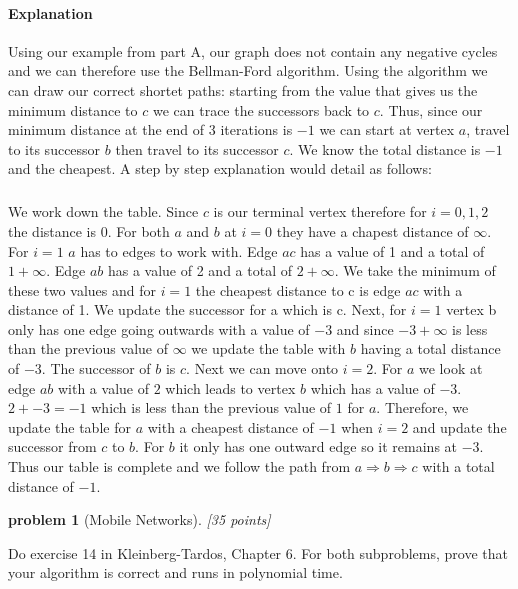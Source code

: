 \documentclass[10pt]{article}
\newtheorem{problem}{\sc\color{cit}problem}
\begin{document}
{\paragraph{Explanation} Using our example from part A, our graph does not contain any negative cycles and we can therefore use the Bellman-Ford algorithm. Using the algorithm we can draw our correct
shortet paths: starting from the value that gives us the minimum distance to $c$ we can trace the successors back to $c$. Thus, since our minimum distance at the end of 3 iterations is $-1$ we can start at vertex $a$,
travel to its successor $b$ then travel to its successor $c$. We know the total distance is $-1$ and the cheapest. A step by step explanation would detail as follows:

\subparagraph{} We work down the table. Since $c$ is our terminal vertex therefore for $i = 0, 1, 2$ the distance is 0. For both $a$ and $b$ at $i = 0$ they have a chapest distance of $\infty$. 
For $i = 1$ $a$ has to edges to work with. Edge $ac$ has a value of 1 and a total of $1 + \infty$. Edge $ab$ has a value of 2 and a total of $2 + \infty$. We take the minimum of these two values and for $i = 1$ the cheapest distance
to c is edge $ac$ with a distance of 1. We update the successor for a which is c. Next, for $i = 1$ vertex b only has one edge going outwards with a value of $-3$ and since $-3 + \infty$ is less than the 
previous value of $\infty$ we update the table with $b$ having a total distance of $-3$. The successor of $b$ is $c$. Next we can move onto $i = 2$. For $a$ we look at edge $ab$ with a value of $2$ which leads to vertex $b$ which has a value of $-3$. 
$2 + -3 = -1$ which is less than the previous value of $1$ for $a$. Therefore, we update the table for $a$ with a cheapest distance of $-1$ when $i = 2$ and update the successor from $c$ to $b$. For $b$ it only has
one outward edge so it remains at $-3$. Thus our table is complete and we follow the path from $a \Rightarrow b \Rightarrow c$ with a total distance of $-1$.   


}

\newpage
\medskip{}

\newpage
\begin{problem}[Mobile Networks][35 points]
\end{problem}
Do exercise 14 in Kleinberg-Tardos, Chapter 6. For both subproblems, prove that your algorithm is correct and runs in polynomial time.
\end{document}
